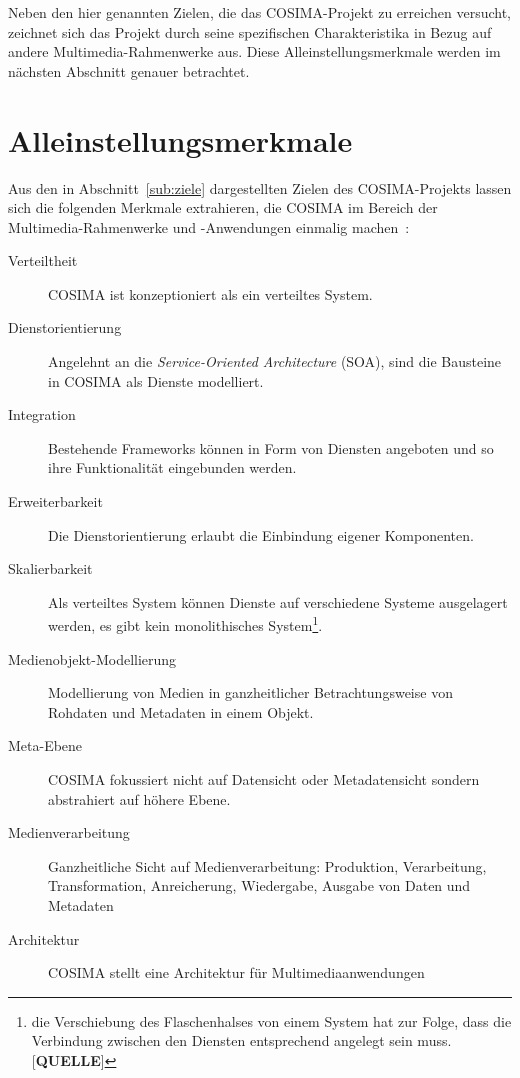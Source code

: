   Neben den hier genannten Zielen, die das COSIMA-Projekt zu erreichen versucht, zeichnet sich das Projekt durch seine spezifischen Charakteristika in Bezug auf andere Multimedia-Rahmenwerke aus. Diese Alleinstellungsmerkmale werden im nächsten Abschnitt genauer betrachtet.


  

\section{Alleinstellungsmerkmale} %
\label{sec:alleinstellungsmerkmale}

  Aus den in Abschnitt~\ref{sub:ziele} dargestellten Zielen des COSIMA-Projekts lassen sich die folgenden Merkmale extrahieren, die COSIMA im Bereich der Multimedia-Rahmenwerke und -Anwendungen einmalig machen~\citep[S. 3f]{bericht}:
  
  \begin{description}
    \item[Verteiltheit] COSIMA ist konzeptioniert als ein verteiltes System.
    \item[Dienstorientierung] Angelehnt an die \emph{Service-Oriented Architecture} (SOA), sind die Bausteine in COSIMA als Dienste modelliert.
    \item[Integration] Bestehende Frameworks können in Form von Diensten angeboten und so ihre Funktionalität eingebunden werden.
    \item[Erweiterbarkeit] Die Dienstorientierung erlaubt die Einbindung eigener Komponenten.
    \item[Skalierbarkeit] Als verteiltes System können Dienste auf verschiedene Systeme ausgelagert werden, es gibt kein monolithisches System\footnote{die Verschiebung des Flaschenhalses von einem System hat zur Folge, dass die Verbindung zwischen den Diensten entsprechend angelegt sein muss. [\textbf{QUELLE}]}.
    \item[Medienobjekt-Modellierung] Modellierung von Medien in ganzheitlicher Betrachtungsweise von Rohdaten und Metadaten in einem Objekt.
    \item[Meta-Ebene] COSIMA fokussiert nicht auf Datensicht oder Metadatensicht sondern abstrahiert auf höhere Ebene.
    \item[Medienverarbeitung] Ganzheitliche Sicht auf Medienverarbeitung: Produktion, Verarbeitung, Transformation, Anreicherung, Wiedergabe, Ausgabe von Daten und Metadaten
    \item[Architektur] COSIMA stellt eine Architektur für Multimediaanwendungen
  \end{description}

